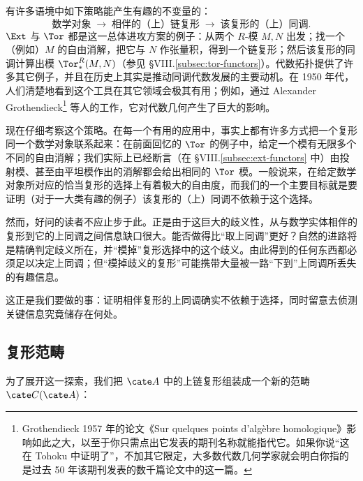 有许多语境中如下策略能产生有趣的不变量的：
\[
\text{数学对象} \;\longrightarrow\; \text{相伴的（上）链复形} \;\longrightarrow\; \text{该复形的（上）同调}.
\]
$\Ext$ 与 $\Tor$ 都是这一总体进攻方案的例子：从两个 $R$-模 $M,N$ 出发；找一个（例如）$M$ 的自由消解，把它与 $N$ 作张量积，得到一个链复形；然后该复形的同调计算出模 $\Tor^R_*(M,N)$（参见 §VIII.\ref{subsec:tor-functors}）。代数拓扑提供了许多其它例子，并且在历史上其实是推动同调代数发展的主要动机。在 1950 年代，人们清楚地看到这个工具在其它领域会极其有用；例如，通过 Alexander Grothendieck\footnote{Grothendieck 1957 年的论文《Sur quelques points d'algèbre homologique》影响如此之大，以至于你只需点出它发表的期刊名称就能指代它。如果你说“这在 Tohoku 中证明了”，不加其它限定，大多数代数几何学家就会明白你指的是过去 50 年该期刊发表的数千篇论文中的这一篇。} 等人的工作，它对代数几何产生了巨大的影响。

现在仔细考察这个策略。在每一个有用的应用中，事实上都有许多方式把一个复形同一个数学对象联系起来：在前面回忆的 $\Tor$ 的例子中，给定一个模有无限多个不同的自由消解；我们实际上已经断言（在 §VIII.\ref{subsec:ext-functors} 中）由投射模、甚至由平坦模作出的消解都会给出相同的 $\Tor$ 模。一般说来，在给定数学对象所对应的恰当复形的选择上有着极大的自由度，而我们的一个主要目标就是要证明（对于一大类有趣的例子）该复形的（上）同调不依赖于这个选择。

然而，好问的读者不应止步于此。正是由于这巨大的歧义性，从与数学实体相伴的复形到它的上同调之间信息缺口很大。能否做得比“取上同调”更好？自然的进路将是精确判定歧义所在，并“模掉”复形选择中的这个歧义。由此得到的任何东西都必须足以决定上同调；但“模掉歧义的复形”可能携带大量被一路“下到”上同调所丢失的有趣信息。

这正是我们要做的事：证明相伴复形的上同调确实不依赖于选择，同时留意去侦测关键信息究竟储存在何处。

\subsection{复形范畴}
\label{subsec:3.2-category-of-complexes}

为了展开这一探索，我们把 $\cate A$ 中的上链复形组装成一个新的范畴 $\cate C(\cate A)$：

